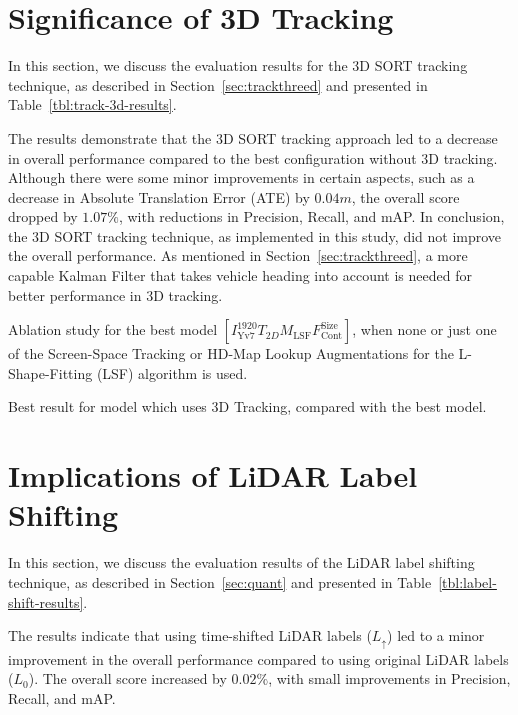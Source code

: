 \section{Significance of 3D Tracking}
\label{sec:impacttracking}

In this section, we discuss the evaluation results for the 3D SORT tracking technique, as described in Section~\ref{sec:trackthreed} and presented in Table~\ref{tbl:track-3d-results}.

The results demonstrate that the 3D SORT tracking approach led to a decrease in overall performance compared to the best configuration without 3D tracking.
Although there were some minor improvements in certain aspects, such as a decrease in Absolute Translation Error (ATE) by $0.04m$, the overall score dropped by $1.07\%$, with reductions in Precision, Recall, and mAP.
In conclusion, the 3D SORT tracking technique, as implemented in this study, did not improve the overall performance.
As mentioned in Section~\ref{sec:trackthreed}, a more capable Kalman Filter that takes vehicle heading into account is needed for better performance in 3D tracking.

\begin{table}[h!]
    
    \caption{Ablation study for the best model $\left[I^{1920}_\text{Yv7}T_{2D}M_\text{LSF}F_\text{Cont}^\text{Size}\right]$, when none or just one of the Screen-Space Tracking or HD-Map Lookup Augmentations for the L-Shape-Fitting (LSF) algorithm is used.}
    \label{tbl:lsf-results}
\end{table}

\begin{table}[h!]
    
    \caption{Best result for model which uses 3D Tracking, compared with the best model.}
    \label{tbl:track-3d-results}
\end{table}

\section{Implications of LiDAR Label Shifting}
\label{sec:impactlidar}

In this section, we discuss the evaluation results of the LiDAR label shifting technique, as described in Section~\ref{sec:quant} and presented in Table~\ref{tbl:label-shift-results}.

The results indicate that using time-shifted LiDAR labels ($L_{\uparrow}$) led to a minor improvement in the overall performance compared to using original LiDAR labels ($L_0$).
The overall score increased by $0.02\%$, with small improvements in Precision, Recall, and mAP.

